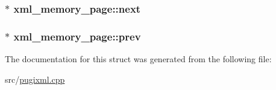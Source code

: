 \label{structxml__memory__page_ab51315db80e7f2a5afb87c56fedcd734}
\hypertarget{structxml__memory__page_a326a74e009af80219ea31bc65ed9e45e}{
\subsubsection[{next}]{$\ast$ {\bf xml\_\-memory\_\-page::next}}}
\label{structxml__memory__page_a326a74e009af80219ea31bc65ed9e45e}
\hypertarget{structxml__memory__page_a014969b0e4a34a6cb24e9823791e60ab}{
\subsubsection[{prev}]{$\ast$ {\bf xml\_\-memory\_\-page::prev}}}
\label{structxml__memory__page_a014969b0e4a34a6cb24e9823791e60ab}


The documentation for this struct was generated from the following file:\begin{DoxyCompactItemize}
\item 
src/\hyperlink{pugixml_8cpp}{pugixml.cpp}\end{DoxyCompactItemize}
